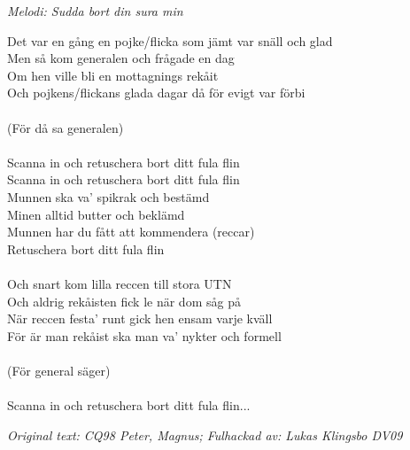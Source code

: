 {\footnotesize\textit{Melodi: Sudda bort din sura min}}\par
\vspace{10pt}
Det var en gång en pojke/flicka som jämt var snäll och glad\\
Men så kom generalen och frågade en dag\\
Om hen ville bli en mottagnings rekåit\\
Och pojkens/flickans glada dagar då för evigt var förbi\\
\\
(För då sa generalen)\\
\\
Scanna in och retuschera bort ditt fula flin\\
Scanna in och retuschera bort ditt fula flin\\
Munnen ska va' spikrak och bestämd\\
Minen alltid butter och beklämd\\
Munnen har du fått att kommendera (reccar)\\
Retuschera bort ditt fula flin\\
\\
Och snart kom lilla reccen till stora UTN\\
Och aldrig rekåisten fick le när dom såg på\\
När reccen festa' runt gick hen ensam varje kväll\\
För är man rekåist ska man va' nykter och formell\\
\\
(För general säger)\\
\\
Scanna in och retuschera bort ditt fula flin...
\par
\vspace{10pt}
{\footnotesize\textit{Original text: CQ98 Peter, Magnus; Fulhackad av: Lukas Klingsbo DV09}}
